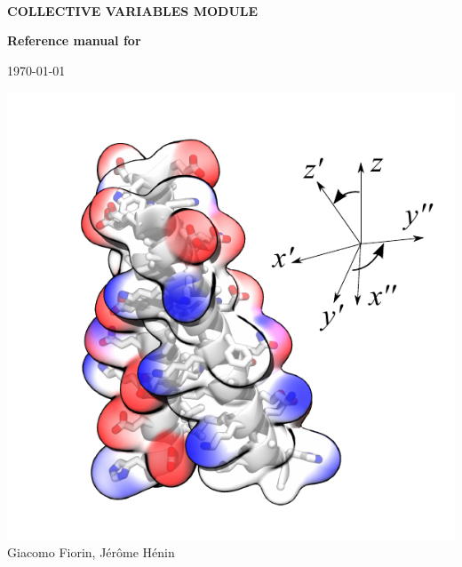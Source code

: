 \documentclass[11pt]{article}
\begin{document}
\begin{titlepage}

  \noindent\colorbox{background-color}{
    \begin{minipage}{1.0\textwidth}

        $\,$\\
        
        \noindent\textsf{\bfseries\Huge COLLECTIVE VARIABLES MODULE\\}
        
        \noindent\textsf{\bfseries\Huge Reference manual for \MDENGINE{} }
        
        \noindent\textsf{\Large \today}

      \end{minipage}}

  \includegraphics[width=\textwidth]{cover}
  \textsf{\large Giacomo Fiorin, J\'er\^ome H\'enin%
 }
\end{titlepage}

\newpage
\tableofcontents
\newpage


\newcommand{\key}[5]{%
  \index{#2!\texttt{#1}}
  {\bf \large \tt #1 } $\langle\,$#3$\,\rangle$ \\%
  {\bf Context: } #2 \\%
  {\bf Acceptable values: } #4 \\%
  {\bf Description: } #5%
}
\newcommand{\keydef}[6]{%
  \index{#2!\texttt{#1}}
  {\bf \large \tt #1 } $\langle\,$#3$\,\rangle$ \\%
  {\bf Context: } #2 \\%
  {\bf Acceptable values: } #4 \\%
  {\bf Default value: } #5 \\%
  {\bf Description: } #6%
}
\newcommand{\gradx}{\mbox{\boldmath$\nabla_{\!\!x}\,$}}
\newcommand{\vx}{{\mbox{\boldmath{$x$}}}}
\newcommand{\bm}[1]{{\mbox{\boldmath{$#1$}}}}
\end{document}
